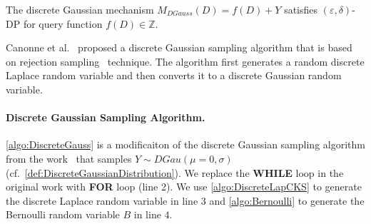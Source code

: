 \begin{theorem}
    The discrete Gaussian mechanism $M_{DGauss}\left(D\right)=f\left(D\right)+Y$ satisfies $\left(\varepsilon,\delta\right) $-DP for query function $f\left(D\right)\in\mathbb{Z} $.
\end{theorem}

Canonne et al.~\cite{canonne2020discrete} proposed a discrete Gaussian sampling algorithm that is based on rejection sampling~\cite{casella2004generalized} technique. The algorithm first generates a random discrete Laplace random variable and then converts it to a discrete Gaussian random variable.



\paragraph{Discrete Gaussian Sampling Algorithm.}
\label{para:DiscreteGaussianSamplingAlgorithm}
\autoref{algo:DiscreteGauss} is a modificaiton of the discrete Gaussian sampling algorithm from the work~\cite{canonne2020discrete} that samples $Y\sim DGau\left( \mu=0,\sigma\right)$ (cf.~\autoref{def:DiscreteGaussianDistribution}).
We replace the \textbf{WHILE} loop in the original work with \textbf{FOR} loop (line 2).
We use \autoref{algo:DiscreteLapCKS} to generate the discrete Laplace random variable in line $3$ and \autoref{algo:Bernoulli} to generate the Bernoulli random variable $B$ in line $4$.

